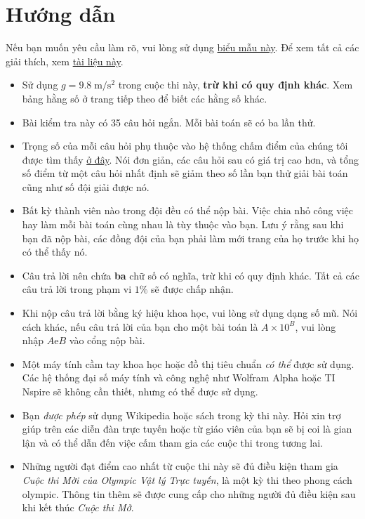 \documentclass[11pt]{article}
\begin{document}
\section*{Hướng dẫn}
Nếu bạn muốn yêu cầu làm rõ, vui lòng sử dụng \href{https://forms.gle/adb6hNCrQFhHVvVe6}{biểu mẫu này}. Để xem tất cả các giải thích, xem \href{https://docs.google.com/document/d/1W71dFM-XDmuTxXJ_MJ3QfSdE_xxISvIw58FZh1wYEIk/edit}{tài liệu này}.
\begin{itemize}
    \item Sử dụng $g=9.8\;\mathrm{m/s^2}$ trong cuộc thi này, \textbf{trừ khi có quy định khác}. Xem bảng hằng số ở trang tiếp theo để biết các hằng số khác.
    \item Bài kiểm tra này có 35 câu hỏi ngắn. Mỗi bài toán sẽ có ba lần thử.
    \item Trọng số của mỗi câu hỏi phụ thuộc vào hệ thống chấm điểm của chúng tôi được tìm thấy \href{https://opho.physoly.tech/static/files/rules24.pdf}{ở đây}. Nói đơn giản, các câu hỏi sau có giá trị cao hơn, và tổng số điểm từ một câu hỏi nhất định sẽ giảm theo số lần bạn thử giải bài toán cũng như số đội giải được nó.
    \item Bất kỳ thành viên nào trong đội đều có thể nộp bài. Việc chia nhỏ công việc hay làm mỗi bài toán cùng nhau là tùy thuộc vào bạn. Lưu ý rằng sau khi bạn đã nộp bài, các đồng đội của bạn phải làm mới trang của họ trước khi họ có thể thấy nó.
    \item Câu trả lời nên chứa \textbf{ba} chữ số có nghĩa, trừ khi có quy định khác. Tất cả các câu trả lời trong phạm vi \(1\%\) sẽ được chấp nhận.
    \item Khi nộp câu trả lời bằng ký hiệu khoa học, vui lòng sử dụng dạng số mũ. Nói cách khác, nếu câu trả lời của bạn cho một bài toán là $A\times 10^B$, vui lòng nhập $A\text{e}B$ vào cổng nộp bài.
    \item Một máy tính cầm tay khoa học hoặc đồ thị tiêu chuẩn \textit{có thể} được sử dụng. Các hệ thống đại số máy tính và công nghệ như Wolfram Alpha hoặc TI Nspire sẽ không cần thiết, nhưng có thể được sử dụng.
    \item Bạn \textit{được phép} sử dụng Wikipedia hoặc sách trong kỳ thi này. Hỏi xin trợ giúp trên các diễn đàn trực tuyến hoặc từ giáo viên của bạn sẽ bị coi là gian lận và có thể dẫn đến việc cấm tham gia các cuộc thi trong tương lai.
    \item Những người đạt điểm cao nhất từ cuộc thi này sẽ đủ điều kiện tham gia \textit{Cuộc thi Mời của Olympic Vật lý Trực tuyến}, là một kỳ thi theo phong cách olympic. Thông tin thêm sẽ được cung cấp cho những người đủ điều kiện sau khi kết thúc \textit{Cuộc thi Mở}.

\end{itemize}
\end{document}
